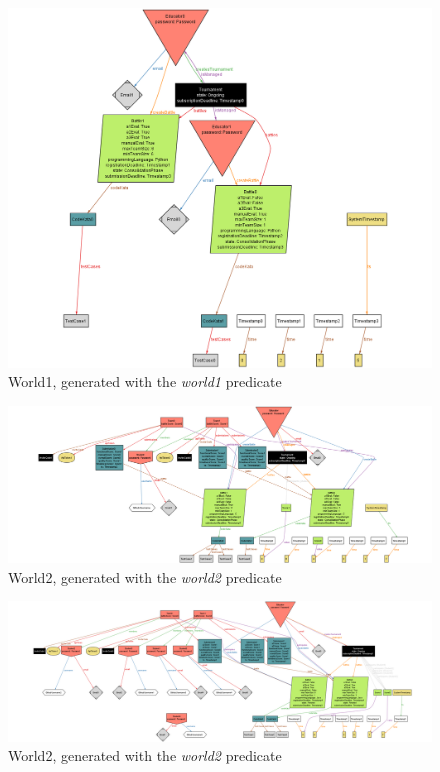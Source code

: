 \begin{figure}[H]
    \vspace{-2cm}
    \hspace{-4cm}
    \includegraphics[width=1.65\textwidth]{Alloy/world1.png}
    \vspace{0.2cm}
    \caption{World1, generated with the \textit{world1} predicate}
\end{figure}

\newpage
\thispagestyle{noheader}

\begin{figure}[H]
    \centering
    \vspace{-4cm}
    \includegraphics[width=1.65\textwidth,angle=90,origin=c]{Alloy/world2.png}
    \caption{World2, generated with the \textit{world2} predicate}
\end{figure}

\newpage
\thispagestyle{noheader}

\begin{figure}[H]
    \centering
    \vspace{-4cm}
    \includegraphics[width=1.65\textwidth,angle=90,origin=c]{Alloy/world3.png}
    \caption{World2, generated with the \textit{world2} predicate}
\end{figure}
\newpage
